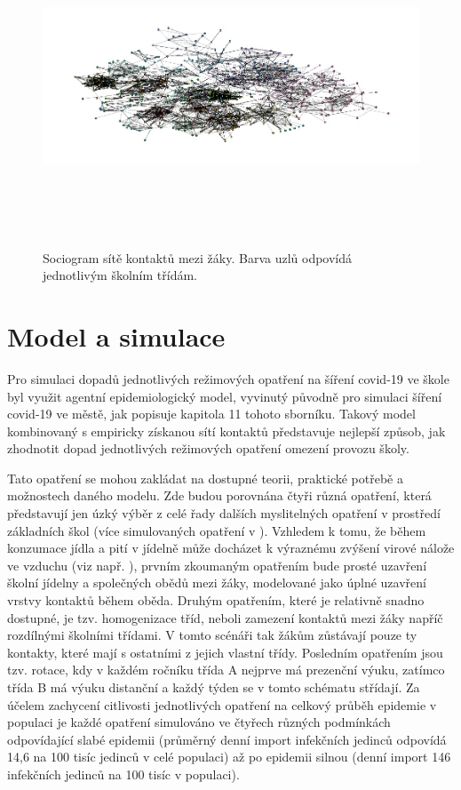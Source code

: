 \begin{figure}[ht]
    \centering
    \includegraphics[width=340pt, height=270pt]{./pic/students_all_classes2.jpg}
    \caption{Sociogram sítě kontaktů mezi žáky. Barva uzlů odpovídá jednotlivým školním třídám.}
    \label{fig:100-teachers}
\end{figure}

\section*{Model a simulace}
Pro simulaci dopadů jednotlivých režimových opatření na šíření covid-19 ve škole byl využit agentní epidemiologický model, vyvinutý původně pro simulaci šíření covid-19 ve městě, jak popisuje kapitola 11 tohoto sborníku. Takový model kombinovaný s empiricky získanou sítí kontaktů představuje nejlepší způsob, jak zhodnotit dopad jednotlivých režimových opatření omezení provozu školy. 

Tato opatření se mohou zakládat na dostupné teorii, praktické potřebě a možnostech daného modelu. Zde budou porovnána čtyři různá opatření, která představují jen úzký výběr z celé řady dalších myslitelných opatření v prostředí základních škol (více simulovaných opatření v \cite{Brom2021.06.28.21259628}). Vzhledem k tomu, že během konzumace jídla a pití v jídelně může docházet k výraznému zvýšení virové nálože ve vzduchu (viz např. \cite{Chen_etal2020, eichler2021transmission}), prvním zkoumaným opatřením bude prosté uzavření školní jídelny a společných obědů mezi žáky, modelované jako úplné uzavření vrstvy kontaktů během oběda. Druhým opatřením, které je relativně snadno dostupné, je tzv. homogenizace tříd, neboli zamezení kontaktů mezi žáky napříč rozdílnými školními třídami. V tomto scénáři tak žákům zůstávají pouze ty kontakty, které mají s ostatními z jejich vlastní třídy. Posledním opatřením jsou tzv. rotace, kdy v každém ročníku třída A nejprve má prezenční výuku, zatímco třída B má výuku distanční a každý týden se v tomto schématu střídají. Za účelem zachycení citlivosti jednotlivých opatření na celkový průběh epidemie v populaci je každé opatření simulováno ve čtyřech různých podmínkách odpovídající slabé epidemii (průměrný denní import infekčních jedinců odpovídá 14,6 na 100 tisíc jedinců v celé populaci) až po epidemii silnou (denní import 146 infekčních jedinců na 100 tisíc v populaci).

